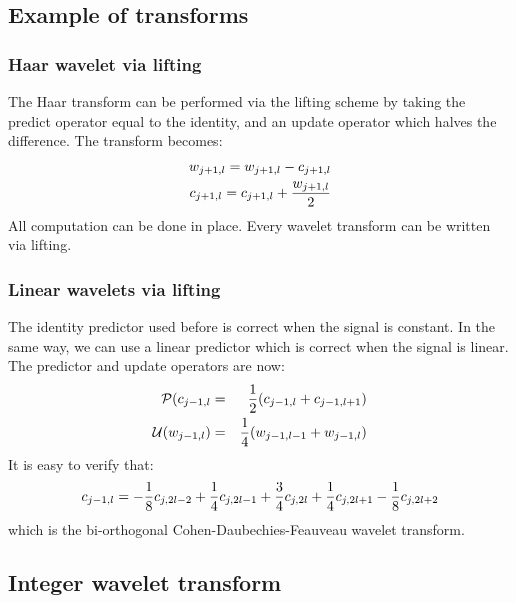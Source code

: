 \subsection*{Example of transforms}

\subsubsection*{Haar wavelet via lifting}

The Haar transform can be performed via the lifting scheme by taking
the predict operator equal to the identity, and an update operator which
halves the difference. The transform becomes:
\begin{eqnarray*}
w_{j+1,l} =  w_{j+1,l} - c_{j+1,l} \\
c_{j+1,l} = c_{j+1,l} + {w_{j+1,l} \over 2}
\end{eqnarray*}
All computation can be done in place. Every wavelet transform can be written
via lifting.


\subsubsection*{Linear wavelets via lifting}
The identity predictor used before is correct when the signal is constant.
In the same way, we can use a linear predictor which is correct when
the signal is linear. The predictor and update operators are now:
\begin{eqnarray*}
{\cal P}(c_{j-1,l} & = & {1 \over 2} (c_{j-1,l} + c_{j-1,l+1}) \\
 {\cal U}(w_{j-1,l}) & = & {1 \over 4} (w_{j-1,l-1} + w_{j-1,l})
\end{eqnarray*}
It is easy to verify that:
\begin{eqnarray*}
c_{j-1,l} = -{1 \over 8} c_{j,2l-2} + {1 \over 4} c_{j,2l-1} + {3 \over 4} c_{j,2l}
+ {1 \over 4} c_{j,2l+1} -{1 \over 8} c_{j,2l+2}
\end{eqnarray*}
which is the bi-orthogonal Cohen-Daubechies-Feauveau \cite{wave:cohen92}
 wavelet transform.


\subsection*{Integer wavelet transform}

